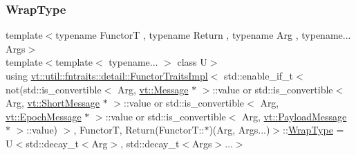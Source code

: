 \subsubsection{\texorpdfstring{Wrap\+Type}{WrapType}}
{\footnotesize\ttfamily template$<$typename FunctorT , typename Return , typename Arg , typename... Args$>$ \\
template$<$template$<$ typename... $>$ class U$>$ \\
using \hyperlink{structvt_1_1util_1_1fntraits_1_1detail_1_1_functor_traits_impl}{vt\+::util\+::fntraits\+::detail\+::\+Functor\+Traits\+Impl}$<$ std\+::enable\+\_\+if\+\_\+t$<$ not(std\+::is\+\_\+convertible$<$ Arg, \hyperlink{namespacevt_a3a3ddfef40b4c90915fa43cdd5f129ea}{vt\+::\+Message} $\ast$ $>$\+::value or std\+::is\+\_\+convertible$<$ Arg, \hyperlink{namespacevt_a1125ac1da6c0bbf141e0ea0739d7602d}{vt\+::\+Short\+Message} $\ast$ $>$\+::value or std\+::is\+\_\+convertible$<$ Arg, \hyperlink{namespacevt_ad67368ffae52d7325002586b41bb150e}{vt\+::\+Epoch\+Message} $\ast$ $>$\+::value or std\+::is\+\_\+convertible$<$ Arg, \hyperlink{namespacevt_a89a92229c5622b855c02c549f83a1a68}{vt\+::\+Payload\+Message} $\ast$ $>$\+::value) $>$, FunctorT, Return(Functor\+T\+::$\ast$)(Arg, Args...)$>$\+::\hyperlink{structvt_1_1util_1_1fntraits_1_1detail_1_1_functor_traits_impl_3_01std_1_1enable__if__t_3_01not_ff7bf429a58012799da4cee5038d568d_af568c800c3dc13d04dce33d8fe8886ba}{Wrap\+Type} =  U$<$std\+::decay\+\_\+t$<$Arg$>$, std\+::decay\+\_\+t$<$Args$>$...$>$}



